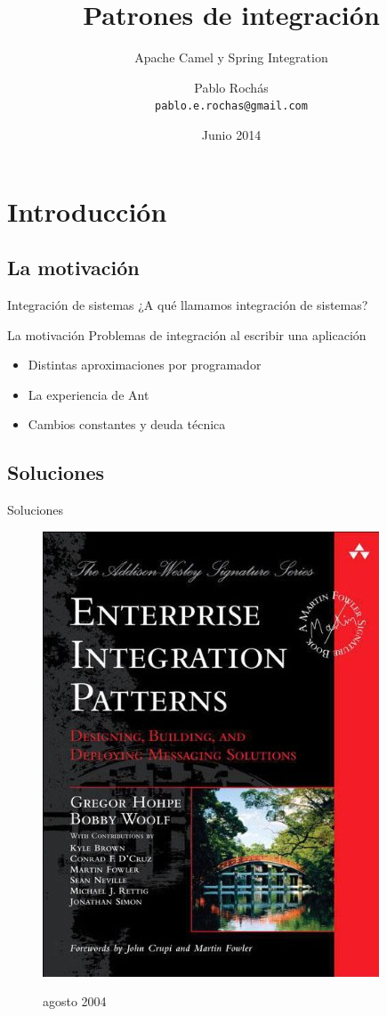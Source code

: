 \documentclass{beamer}
\title{Patrones de integración}
\subtitle{Apache Camel y Spring Integration}
\author[Despegar.com]{Pablo Rochás\\ \texttt{pablo.e.rochas@gmail.com}}
\date[Despegar]{Junio 2014}
\begin{document}
\begin{frame}
\titlepage
\end{frame}

\section{Introducción}
\subsection{La motivación}
\begin{frame}{Integración de sistemas}
¿A qué llamamos integración de sistemas?
\end{frame}

\begin{frame}{La motivación}
Problemas de integración al escribir una aplicación
\begin{itemize}[<+->]
\item Distintas aproximaciones por programador
\item La experiencia de Ant
\item Cambios constantes y deuda técnica
\end{itemize}
\end{frame}

\subsection{Soluciones}
\begin{frame}{Soluciones}
\begin{figure}
\begin{center}
\includegraphics[scale=0.35]{TAPA}

agosto 2004
\end{center}
\end{figure}
\end{frame}
\end{document}
